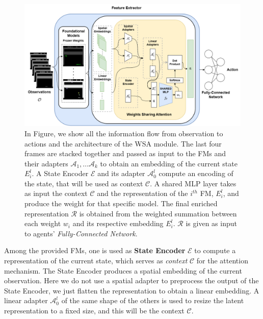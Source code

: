 \begin{figure}[ht]
    \begin{center}
        \includegraphics[width=1\textwidth]{images/wsa_main_architecture}
    \end{center}
    \caption{In Figure, we show all the information flow from observation to actions and the architecture of the WSA module. The last four frames are stacked together and passed as input to the FMs and their adapters $\mathcal{A}_1, \dots \mathcal{A}_k$ to obtain an embedding of the current state $E^l_i$. A State Encoder $\mathcal{E}$ and its adapter $\mathcal{A}^l_0$ compute an encoding of the state, that will be used as context $\mathcal{C}$. A shared MLP layer takes as input the context $\mathcal{C}$ and the representation of the $i^{th}$ FM, $E^l_i$, and produce the weight for that specific model. The final enriched representation $\mathcal{R}$ is obtained from the weighted summation between each weight $w_i$ and its respective embedding $E^l_i$. $\mathcal{R}$ is given as input to agents' \textit{Fully-Connected Network}.}
    \label{fig:wsa_main_architecture}
\end{figure}


Among the provided FMs, one is used as \textbf{State Encoder} $\mathcal{E}$ to compute a representation of the current state, which serves as \textit{context} $\mathcal{C}$ for the attention mechanism.
The State Encoder produces a spatial embedding of the current observation.
Here we do not use a spatial adapter to preprocess the output of the State Encoder, we just flatten the representation to obtain a linear embedding.
A linear adapter $\mathcal{A}^{l}_0$ of the same shape of the others is used to resize the latent representation to a fixed size, and this will be the context $\mathcal{C}$.

